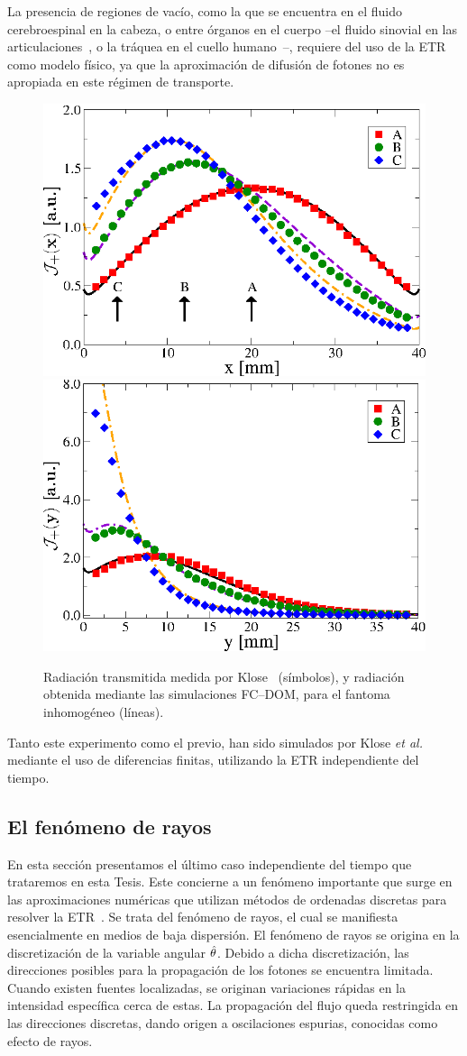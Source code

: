 La presencia de regiones de vacío, como la que se encuentra en el 
fluido cerebroespinal en la cabeza, o entre órganos en el cuerpo 
--el fluido sinovial en las articulaciones~\cite{Netz2001}, 
o la tráquea en el cuello humano~\cite{Fujii2016}--, 
requiere del uso de la ETR como modelo físico, ya que la 
aproximación de difusión de fotones no es apropiada en este régimen de transporte. 
\begin{figure}[h!]
\centering
  \includegraphics[width=0.48\linewidth]{figuras/kloseph2x.eps}
  \includegraphics[width=0.48\linewidth]{figuras/ph2y.eps}
  \caption{Radiación transmitida medida por Klose~\cite{Klose2002} (símbolos),
  y radiación obtenida mediante las simulaciones FC--DOM, para 
  el fantoma inhomogéneo (líneas).}
 \label{fig:fluxph2}
\end{figure}
Tanto este experimento como el previo, han sido simulados por Klose {\it et al.} 
\cite{Klose2002} mediante el uso de diferencias finitas, utilizando la ETR 
independiente del tiempo.

\subsection{El fenómeno de rayos}
\label{subsec:rayeff}
En esta sección presentamos el último caso independiente del tiempo 
que trataremos en esta Tesis. Este concierne a un 
fenómeno importante que surge en las aproximaciones numéricas 
que utilizan métodos de ordenadas discretas para resolver la ETR~\cite{Lewis1984}. 
Se trata del fenómeno de rayos, 
el cual se manifiesta esencialmente en medios de baja dispersión. 
El fenómeno de rayos se origina en la discretización 
de la variable angular $\hat{\theta}$. Debido a dicha discretización, 
las direcciones posibles para la propagación de los fotones 
se encuentra limitada. Cuando existen fuentes localizadas, 
se originan variaciones rápidas en la intensidad específica 
cerca de estas. La propagación del flujo queda restringida 
en las direcciones discretas, dando origen a oscilaciones 
espurias, conocidas como efecto de rayos. 

